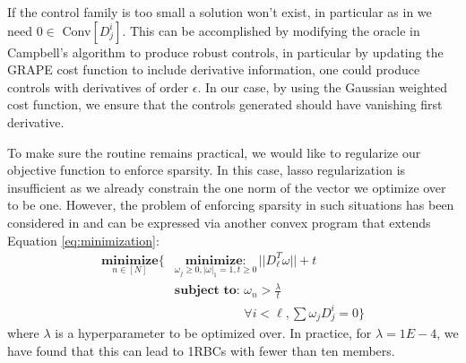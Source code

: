 \documentclass[aps,nofootinbib,pra,notitlepage,twocolumn]{revtex4-1}
\begin{document}
If the control family is too small a solution won't exist, in particular as in \cite{Campbell2017} we need  $0\in $ Conv$[D_j^i]$.  This can be accomplished by modifying the oracle in Campbell's algorithm to produce robust controls, in particular by updating the GRAPE cost function to include derivative information, one could produce controls with derivatives of order $\epsilon$. In our case, by using the Gaussian weighted cost function, we ensure that the controls generated should have vanishing first derivative.

To make sure the routine remains practical, we would like to regularize our objective function to enforce sparsity. In this case, lasso regularization \cite{tibshirani1996regression} is insufficient as we already constrain the one norm of the vector we optimize over to be one. However, the problem of enforcing sparsity in such situations has been considered in \cite{NIPS2012_4504} and can be expressed via another convex program that extends Equation \ref{eq:minimization}:
\begin{equation} 
\begin{split}
\underset{n\in[N]}{\textbf{minimize}}\{
    &\underset{\omega_j\geq0, |\omega|_1=1, t\geq0}{\textbf{minimize}: } ||D_{\ell}^T\omega|| + t\\
    &\textbf{subject to: } \omega_n > \frac{\lambda}{t}\\
    &\phantom{\textbf{subject to: }} \forall i<\ell, \sum \omega_jD_j^i=0\}
\end{split}
\end{equation} where $\lambda$ is a hyperparameter to be optimized over. In practice, for $\lambda=1E-4$, we have found that this can lead to 1RBCs with fewer than ten members.



\end{document}
